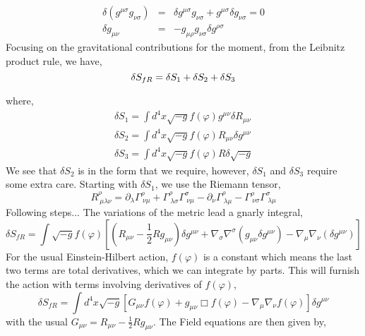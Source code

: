 \begin{eqnarray}
    \delta(g^{\mu\sigma}g_{\nu\sigma}) &=& \delta g^{\mu\sigma}g_{\nu\sigma} + g^{\mu\sigma}\delta g_{\nu\sigma}= 0 \nonumber\\
    \delta g_{\mu\nu} &=& -g_{\mu\rho}g_{\nu\sigma}\delta g^{\rho\sigma}
\end{eqnarray}
Focusing on the gravitational contributions for the moment, from the Leibnitz product rule, we have,
\begin{equation}
    \delta S_{fR} = \delta S_1 + \delta S_2 + \delta S_3\\
\end{equation}

where,
\begin{eqnarray}
    \delta S_1 = \int d^4 x \sqrt{-g} f(\varphi) g^{\mu\nu}\delta R_{\mu\nu}\\
    \delta S_2 = \int d^4 x \sqrt{-g} f(\varphi) R_{\mu\nu} \delta g^{\mu\nu}\\
    \delta S_3 = \int d^4 x \sqrt{-g} f(\varphi) R\delta\sqrt{-g}
\end{eqnarray}
We see that $\delta S_2$ is in the form that we require, however, $\delta S_1$ and $\delta S_3$ require some extra care. Starting with $\delta S_1$, we use the Riemann tensor, 
\begin{equation}
    R^{\rho}_{\ \mu \lambda \nu} = \partial_{\lambda}\Gamma^{\rho}_{\ \nu \mu} + \Gamma^{\rho}_{\ \lambda \sigma} \Gamma^{\sigma}_{\ \nu\mu} - \partial_{\nu}\Gamma^{\rho}_{\ \lambda \mu} - \Gamma^{\rho}_{\ \nu \sigma} \Gamma^{\sigma}_{\ \lambda\mu}
\end{equation}
Following steps...
The variations of the metric lead a gnarly integral, 
\begin{equation}
    \delta S_{fR} = \int\sqrt{-g}f(\varphi)\left[\left(R_{\mu\nu}- \frac{1}{2} Rg_{\mu\nu}\right)\delta g^{\mu\nu} + \nabla_{\sigma}\nabla^{\sigma}(g_{\mu\nu}\delta g^{\mu\nu}) - \nabla_{\mu}\nabla_{\nu}(\delta g^{\mu\nu})\right]
\end{equation}
For the usual Einstein-Hilbert action, $f(\varphi)$ is a constant which means the last two terms are total derivatives, which we can integrate by parts. This will furnish the action with terms involving derivatives of $f(\varphi)$,
\begin{equation}
    \delta S_{fR} = \int d^4x\sqrt{-g}\left[G_{\mu\nu}f(\varphi) + g_{\mu\nu}\Box f(\varphi)  - \nabla_{\mu}\nabla_{\nu}f(\varphi)\right]\delta g^{\mu\nu}
\end{equation}
with the usual $G_{\mu\nu} = R_{\mu\nu}- \frac{1}{2} Rg_{\mu\nu}$. The Field equations are then given by, 
